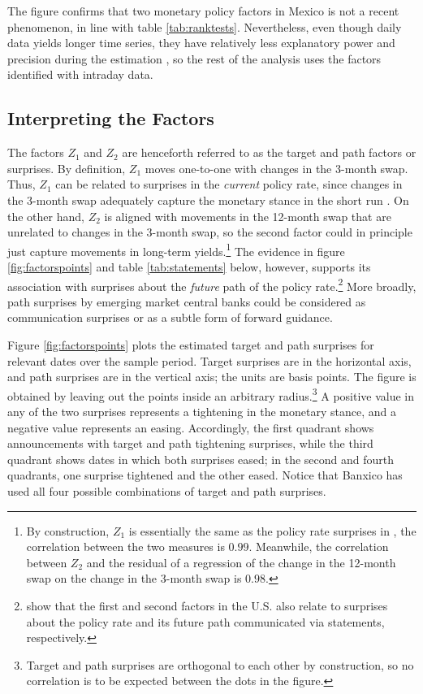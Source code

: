 \documentclass[a4paper, 12pt]{article}
\providecommand{\rotated}{Z}
\providecommand{\rtdone}{\rotated_{1}}
\providecommand{\rtdtwo}{\rotated_{2}}
\begin{document}
The figure confirms that two monetary policy factors in Mexico is not a recent phenomenon, in line with table \ref{tab:ranktests}. 
Nevertheless, even though daily data yields longer time series, they have relatively less explanatory power and precision during the estimation \parencite{KearnsManners:2006,Solis:FX}, so the rest of the analysis uses the factors identified with intraday data.


\subsection{Interpreting the Factors} \label{sec:interpretation}
The factors \(\rtdone\) and \(\rtdtwo\) are henceforth referred to as the target and path factors or surprises. 
By definition, \(\rtdone\) moves one-to-one with changes in the 3-month swap. 
Thus, \(\rtdone\) can be related to surprises in the \textit{current} policy rate, since changes in the 3-month swap adequately capture the monetary stance in the short run \parencite{Solis:FX}. 
On the other hand, \(\rtdtwo\) is aligned with movements in the 12-month swap that are unrelated to changes in the 3-month swap, so the second factor could in principle just capture movements in long-term yields.\footnote{ By construction, \(\rtdone\) is essentially the same as the policy rate surprises in \textcite{Solis:FX}, the correlation between the two measures is \(0.99\). Meanwhile, the correlation between \(\rtdtwo\) and the residual of a regression of the change in the 12-month swap on the change in the 3-month swap is \(0.98\).} 
The evidence in figure \ref{fig:factorspoints} and table \ref{tab:statements} below, however, supports its association with surprises about the \textit{future} path of the policy rate.\footnote{\textcite{GSS:2005a,Swanson:2021} show that the first and second factors in the U.S. also relate to surprises about the policy rate and its future path communicated via statements, respectively.} 
More broadly, path surprises by emerging market central banks could be considered as communication surprises or as a subtle form of forward guidance. 

Figure \ref{fig:factorspoints} plots the estimated target and path surprises for relevant dates over the sample period. 
Target surprises are in the horizontal axis, and path surprises are in the vertical axis; the units are basis points. 
The figure is obtained by leaving out the points inside an arbitrary radius.\footnote{Target and path surprises are orthogonal to each other by construction, so no correlation is to be expected between the dots in the figure.} 
A positive value in any of the two surprises represents a tightening in the monetary stance, and a negative value represents an easing. 
Accordingly, the first quadrant shows announcements with target and path tightening surprises, while the third quadrant shows dates in which both surprises eased; 
in the second and fourth quadrants, one surprise tightened and the other eased.
Notice that Banxico has used all four possible combinations of target and path surprises. 
\end{document}
